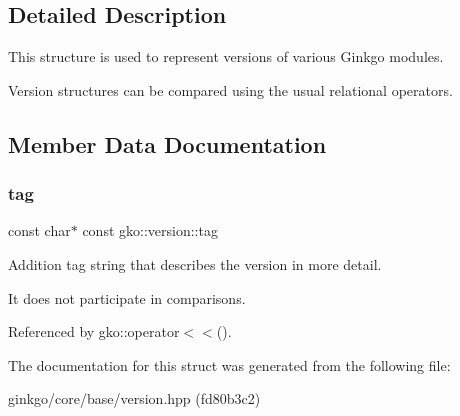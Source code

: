 \subsection{Detailed Description}
This structure is used to represent versions of various Ginkgo modules. 

Version structures can be compared using the usual relational operators. 

\subsection{Member Data Documentation}
\mbox{\label{structgko_1_1version_a1bd0eaa4d551c145ff9cd0c10e555ac3}} 
\subsubsection{\texorpdfstring{tag}{tag}}
{\footnotesize\ttfamily const char$\ast$ const gko\+::version\+::tag}



Addition tag string that describes the version in more detail. 

It does not participate in comparisons. 

Referenced by gko\+::operator$<$$<$().



The documentation for this struct was generated from the following file\+:\begin{DoxyCompactItemize}
\item 
ginkgo/core/base/version.\+hpp (fd80b3c2)\end{DoxyCompactItemize}
